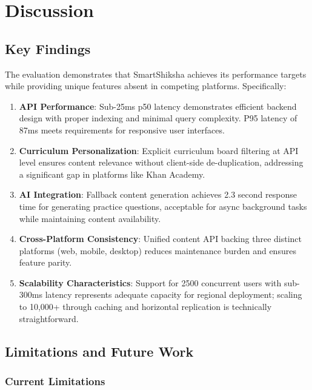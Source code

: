 \documentclass[10pt,conference,compsocconf]{IEEEtran}
\begin{document}
\section{Discussion}
\label{sec:discussion}

\subsection{Key Findings}

The evaluation demonstrates that SmartShiksha achieves its performance targets while providing unique features absent in competing platforms. Specifically:

\begin{enumerate}
    \item \textbf{API Performance}: Sub-25ms p50 latency demonstrates efficient backend design with proper indexing and minimal query complexity. P95 latency of 87ms meets requirements for responsive user interfaces.
    
    \item \textbf{Curriculum Personalization}: Explicit curriculum board filtering at API level ensures content relevance without client-side de-duplication, addressing a significant gap in platforms like Khan Academy.
    
    \item \textbf{AI Integration}: Fallback content generation achieves 2.3 second response time for generating practice questions, acceptable for async background tasks while maintaining content availability.
    
    \item \textbf{Cross-Platform Consistency}: Unified content API backing three distinct platforms (web, mobile, desktop) reduces maintenance burden and ensures feature parity.
    
    \item \textbf{Scalability Characteristics}: Support for 2500 concurrent users with sub-300ms latency represents adequate capacity for regional deployment; scaling to 10,000+ through caching and horizontal replication is technically straightforward.
\end{enumerate}

\subsection{Limitations and Future Work}

\subsubsection{Current Limitations}
\end{document}
